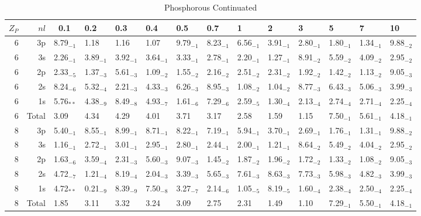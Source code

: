 \documentclass[preprint,showpacs,pra]{revtex4}
\begin{document}
\begin{table}[htbp]
\caption{Phosphorous Continuated}%
\begin{tabular}{|r|r|llllllllllll|}
\hline
$Z_P$ & $nl$ & \ 0.1 & 0.2 & 0.3 & 0.4 & 0.5 & 0.7 & 1 & 2 & 3 & 5 & 7 & 10
\\ \hline
6 & 3p & 8.79$_{-1}$ & 1.18$_{ }$ & 1.16$_{ }$ & 1.07$_{ }$ & 9.79$_{-1}$ & 
8.23$_{-1}$ & 6.56$_{-1}$ & 3.91$_{-1}$ & 2.80$_{-1}$ & 1.80$_{-1}$ & 1.34$%
_{-1}$ & 9.88$_{-2}$ \\ 
6 & 3s & 2.26$_{-1}$ & 3.89$_{-1}$ & 3.92$_{-1}$ & 3.64$_{-1}$ & 3.33$_{-1}$
& 2.78$_{-1}$ & 2.20$_{-1}$ & 1.27$_{-1}$ & 8.91$_{-2}$ & 5.59$_{-2}$ & 4.09$%
_{-2}$ & 2.95$_{-2}$ \\ 
6 & 2p & 2.33$_{-5}$ & 1.37$_{-3}$ & 5.61$_{-3}$ & 1.09$_{-2}$ & 1.55$_{-2}$
& 2.16$_{-2}$ & 2.51$_{-2}$ & 2.31$_{-2}$ & 1.92$_{-2}$ & 1.42$_{-2}$ & 1.13$%
_{-2}$ & 9.05$_{-3}$ \\ 
6 & 2s & 8.24$_{-6}$ & 5.32$_{-4}$ & 2.21$_{-3}$ & 4.33$_{-3}$ & 6.26$_{-3}$
& 8.95$_{-3}$ & 1.08$_{-2}$ & 1.04$_{-2}$ & 8.77$_{-3}$ & 6.43$_{-3}$ & 5.06$%
_{-3}$ & 3.99$_{-3}$ \\ 
6 & 1s & 5.76$_{**}$ & 4.38$_{-9}$ & 8.49$_{-8}$ & 4.93$_{-7}$ & 1.61$_{-6}$
& 7.29$_{-6}$ & 2.59$_{-5}$ & 1.30$_{-4}$ & 2.13$_{-4}$ & 2.74$_{-4}$ & 2.71$%
_{-4}$ & 2.25$_{-4}$ \\ 
6 & Total & 3.09$_{ }$ & 4.34$_{ }$ & 4.29$_{ }$ & 4.01$_{ }$ & 3.71$_{ }$ & 
3.17$_{ }$ & 2.58$_{ }$ & 1.59$_{ }$ & 1.15$_{ }$ & 7.50$_{-1}$ & 5.61$_{-1}$
& 4.18$_{-1}$ \\ \hline
8 & 3p & 5.40$_{-1}$ & 8.55$_{-1}$ & 8.99$_{-1}$ & 8.71$_{-1}$ & 8.22$_{-1}$
& 7.19$_{-1}$ & 5.94$_{-1}$ & 3.70$_{-1}$ & 2.69$_{-1}$ & 1.76$_{-1}$ & 1.31$%
_{-1}$ & 9.88$_{-2}$ \\ 
8 & 3s & 1.16$_{-1}$ & 2.72$_{-1}$ & 3.01$_{-1}$ & 2.95$_{-1}$ & 2.80$_{-1}$
& 2.44$_{-1}$ & 2.00$_{-1}$ & 1.21$_{-1}$ & 8.64$_{-2}$ & 5.49$_{-2}$ & 4.04$%
_{-2}$ & 2.95$_{-2}$ \\ 
8 & 2p & 1.63$_{-6}$ & 3.59$_{-4}$ & 2.31$_{-3}$ & 5.60$_{-3}$ & 9.07$_{-3}$
& 1.45$_{-2}$ & 1.87$_{-2}$ & 1.96$_{-2}$ & 1.72$_{-2}$ & 1.33$_{-2}$ & 1.08$%
_{-2}$ & 9.05$_{-3}$ \\ 
8 & 2s & 4.72$_{-7}$ & 1.21$_{-4}$ & 8.19$_{-4}$ & 2.04$_{-3}$ & 3.39$_{-3}$
& 5.65$_{-3}$ & 7.61$_{-3}$ & 8.63$_{-3}$ & 7.73$_{-3}$ & 5.98$_{-3}$ & 4.82$%
_{-3}$ & 3.99$_{-3}$ \\ 
8 & 1s & 4.72$_{**}$ & 0.21$_{-9}$ & 8.39$_{-9}$ & 7.50$_{-8}$ & 3.27$_{-7}$
& 2.14$_{-6}$ & 1.05$_{-5}$ & 8.19$_{-5}$ & 1.60$_{-4}$ & 2.38$_{-4}$ & 2.50$%
_{-4}$ & 2.25$_{-4}$ \\ 
8 & Total & 1.85$_{ }$ & 3.11$_{ }$ & 3.32$_{ }$ & 3.24$_{ }$ & 3.09$_{ }$ & 
2.75$_{ }$ & 2.31$_{ }$ & 1.49$_{ }$ & 1.10$_{ }$ & 7.29$_{-1}$ & 5.50$_{-1}$
& 4.18$_{-1}$ \\ \hline\hline
\end{tabular}%
\end{table}
\end{document}

